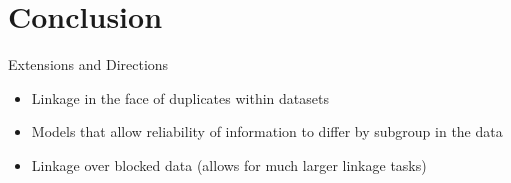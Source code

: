 \documentclass{beamer}
\begin{document}
\section{Conclusion}

\begin{frame}{Extensions and Directions}
	\begin{itemize}
	\item Linkage in the face of duplicates within datasets
	
	\item Models that allow reliability of information to differ by subgroup in the data
	
	\item Linkage over blocked data (allows for much larger linkage tasks)
	\end{itemize}
\end{frame}
\end{document}
